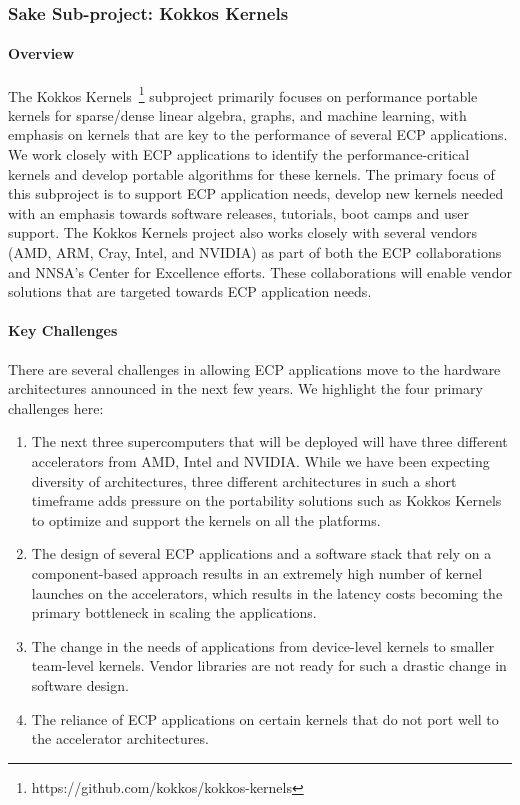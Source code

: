 \subsubsection{ Sake Sub-project: Kokkos Kernels} 
\paragraph{Overview} 
The Kokkos Kernels~\footnote{https://github.com/kokkos/kokkos-kernels} subproject primarily focuses on performance portable kernels
for sparse/dense linear algebra, graphs, and machine learning, with emphasis on
kernels that are key to the performance of
several ECP applications. We work closely with ECP applications to identify the
performance-critical kernels and develop portable algorithms for these kernels.
The primary focus of this subproject is to support ECP application needs, develop new
kernels needed with an emphasis towards software releases, tutorials, boot camps
and user support. The Kokkos Kernels project also works closely with several vendors
(AMD, ARM, Cray, Intel, and NVIDIA) as part of both the ECP collaborations and
NNSA's Center for Excellence efforts. These collaborations will  enable vendor solutions
that are targeted towards ECP application needs.

\paragraph{Key  Challenges}
There are several challenges in allowing ECP applications move to the hardware architectures
announced in the next few years. We highlight the four primary challenges here:
\begin{enumerate}
\item 
The next three supercomputers that will be deployed will have
three different accelerators from AMD, Intel and NVIDIA. While we have been expecting diversity of architectures, three
different architectures in such a short timeframe adds pressure on the portability
solutions such as Kokkos Kernels to optimize and support the kernels on all the platforms.
\item
The design of several ECP applications and a software stack that rely on a component-based
approach results in an extremely high number of kernel launches on the accelerators, which
results in the latency costs becoming the primary bottleneck in scaling the applications.
\item
The change in the needs of applications from device-level kernels to smaller team-level kernels. Vendor
libraries are not ready for such a drastic change in software design.
\item 
The reliance of ECP applications on certain kernels that do not port well to the  accelerator architectures.
\end{enumerate}

